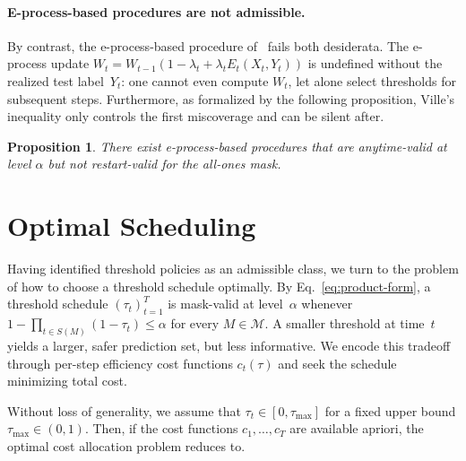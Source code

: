 \documentclass{uai2026} %
\newtheorem{proposition}[theorem]{Proposition}
\newcommand{\1}{\mathbf{1}}
\newcommand{\mcal}{\mathcal{M}}
\begin{document}
\paragraph{E-process-based procedures are not admissible.}
By contrast, the e-process-based procedure of~\citet{gauthier2025values} fails both desiderata.
The e-process update $W_t = W_{t-1}(1-\lambda_t + \lambda_t E_t(X_t, Y_t))$ is undefined without the realized test label~$Y_t$: one cannot even compute $W_t$, let alone select thresholds for subsequent steps.
Furthermore, as formalized by the following proposition, Ville's inequality only controls  the first miscoverage and can be silent after.

\begin{proposition}
  \label{prop:e-process-not-restart}
  There exist e-process-based procedures that are anytime-valid at level $\alpha$ but not restart-valid for the all-ones mask.
\end{proposition}




\section{Optimal Scheduling}
\label{sec:finite}
\label{sec:optimal_schedule}

Having identified threshold policies as an admissible class, we turn to the problem of how to choose a threshold schedule optimally. By Eq.~\eqref{eq:product-form}, a threshold schedule $(\tau_t)_{t=1}^T$ is mask-valid at level~$\alpha$ whenever $1 - \prod_{t \in S(M)}(1-\tau_t) \le \alpha$ for every $M \in \mcal$. A smaller threshold at time~$t$ yields a larger, safer prediction set, but less informative.
We encode this tradeoff through  per-step efficiency cost functions $c_t(\tau)$ and seek the schedule minimizing total cost.

Without loss of generality, we assume that $\tau_t \in [0, \tau_{\max}]$ for a fixed upper bound $\tau_{\max} \in (0,1)$. Then, if the cost functions $c_1,\ldots,c_T$ are available apriori, the optimal cost allocation problem reduces to.
\end{document}
